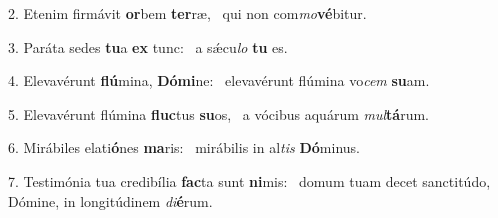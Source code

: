 2. Etenim firmávit \textbf{or}bem \textbf{ter}ræ, \ast\  qui non com\textit{mo}\textbf{vé}bitur.\

3. Paráta sedes \textbf{tu}a \textbf{ex} tunc: \ast\  a sǽcu\textit{lo} \textbf{tu} es.\

4. Elevavérunt \textbf{flú}mina, \textbf{Dó}\textbf{mi}ne: \ast\  elevavérunt flúmina vo\textit{cem} \textbf{su}am.\

5. Elevavérunt flúmina \textbf{fluc}tus \textbf{su}os, \ast\  a vócibus aquárum \textit{mul}\textbf{tá}rum.\

6. Mirábiles elati\textbf{ó}nes \textbf{ma}ris: \ast\  mirábilis in al\textit{tis} \textbf{Dó}minus.\

7. Testimónia tua credibília \textbf{fac}ta sunt \textbf{ni}mis: \ast\  domum tuam decet sanctitúdo, Dómine, in longitúdinem \textit{di}\textbf{é}rum.\

